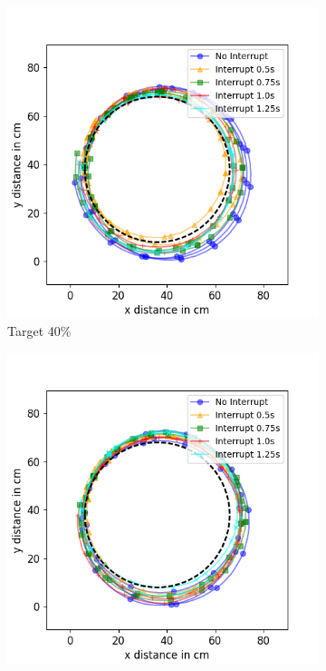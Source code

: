 \begin{figure}[h!]
	\centering
	\begin{subfigure}[b]{0.5\textwidth}
		\includegraphics[width=\textwidth]{pics/circle_40.png}
		\caption{Target 40\%}
		\label{fig:circ_exp1}
	\end{subfigure}
	\begin{subfigure}[b]{0.5\textwidth}
		\includegraphics[width=\textwidth]{pics/circle_65.png}

\end{subfigure}
\end{figure}
